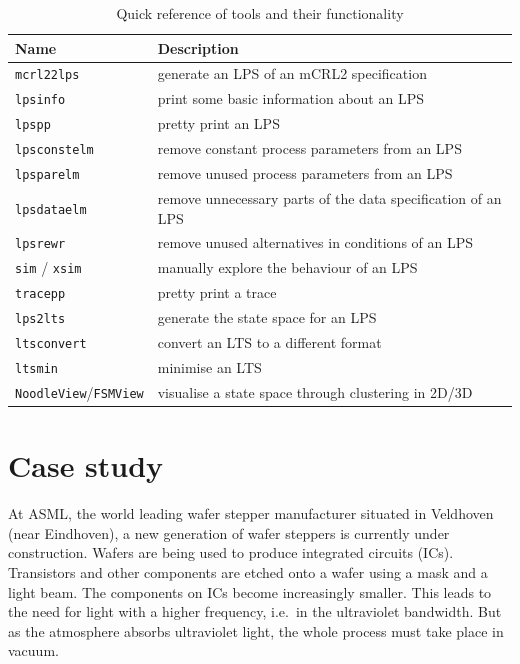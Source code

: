 \documentclass[a4paper,fleqn]{article}
\begin{document}
\begin{table}[H]
\begin{center}
\begin{tabular}{|l|l|}
\hline
\textbf{Name}             & \textbf{Description}\\
\hline
\texttt{mcrl22lps}                   & generate an LPS of an mCRL2 specification \\
\hline
\texttt{lpsinfo}                     & print some basic information about an LPS \\
\texttt{lpspp}                       & pretty print an LPS\\
\texttt{lpsconstelm}                 & remove constant process parameters from an LPS \\
\texttt{lpsparelm}                   & remove unused process parameters from an LPS \\
\texttt{lpsdataelm}                  & remove unnecessary parts of the data specification of an LPS \\
\texttt{lpsrewr}                     & remove unused alternatives in conditions of an LPS\\
\hline
\texttt{sim} / \texttt{xsim}         & manually explore the behaviour of an LPS \\
\texttt{tracepp}                     & pretty print a trace \\
\hline
\texttt{lps2lts}                     & generate the state space for an LPS \\
\texttt{ltsconvert}                  & convert an LTS to a different format \\
\texttt{ltsmin}                      & minimise an LTS \\
\hline
\texttt{NoodleView}/\texttt{FSMView} & visualise a state space through clustering in 2D/3D\\
\hline
\end{tabular}
\end{center}
\caption{Quick reference of tools and their functionality}
\label{tab:toolref}
\end{table}

\section{Case study}
\label{subsec:case}
At ASML, the world leading wafer stepper manufacturer situated in Veldhoven
(near Eindhoven), a new generation of wafer steppers is currently under
construction. Wafers are being used to produce integrated circuits (ICs).
Transistors and other components are etched onto a wafer using a mask and
a light beam. The components on ICs become increasingly smaller. This leads to the
need for light with a higher frequency, i.e.\ in the ultraviolet bandwidth.  But
as the atmosphere absorbs ultraviolet light, the whole process must take place
in vacuum.
\end{document}
